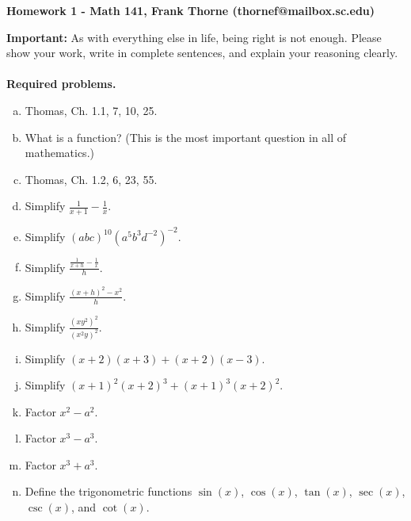 \documentclass[12pt]{article}
\begin{document}
\setlength{\topmargin}{-2mm}





\begin{center}{\bf Homework 1 - Math 141, Frank Thorne (thornef@mailbox.sc.edu)}
\end{center}

{\bf Important:} As with everything else in life, being right is not enough.
Please show your work, write in complete sentences, and explain your reasoning clearly. 
\\
\\
{\bf Required problems.}

\begin{enumerate}[(a)]
\item 
Thomas, Ch. 1.1, 7, 10, 25.

\item
What is a function? (This is the most important question in all of mathematics.)

\item
Thomas, Ch. 1.2, 6, 23, 55.

\item
Simplify $\frac{1}{x + 1} - \frac{1}{x}$.

\item
Simplify $(abc)^{10} (a^5 b^3 d^{-2})^{-2}$.

\item
Simplify $\frac{ \frac{1}{x + h} - \frac{1}{x}}{h}$.

\item
Simplify $\frac{(x + h)^2 - x^2}{h}$.

\item
Simplify $\frac{(xy^2)^2}{(x^2y)^2}$.

\item
Simplify $(x + 2)(x + 3) + (x + 2)(x - 3)$.

\item
Simplify $(x + 1)^2 (x + 2)^3 + (x + 1)^3 (x + 2)^2$.

\item
Factor $x^2 - a^2$.

\item
Factor $x^3 - a^3$.

\item
Factor $x^3 + a^3$.

\item
Define the trigonometric 
functions $\sin(x)$, $\cos(x)$, $\tan(x)$, $\sec(x)$, $\csc(x)$,
and $\cot(x)$.


\end{enumerate}
\end{document}
